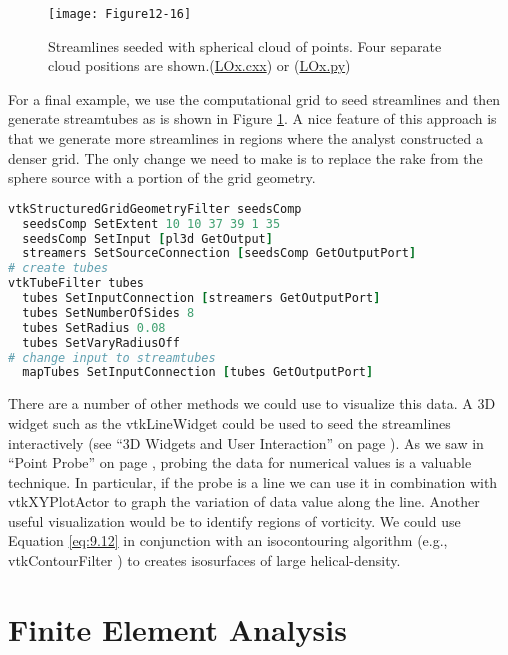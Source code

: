 \begin{figure}[!htb]
	\centering
	\texttt{[image: Figure12-16]}
	\caption{Streamlines seeded with spherical cloud of points. Four separate cloud positions are shown.(\href{https://lorensen.github.io/VTKExamples/site/Cxx/VisualizationAlgorithms/LOx/}{LOx.cxx}) or (\href{https://lorensen.github.io/VTKExamples/site/Python/VisualizationAlgorithms/LOx/}{LOx.py})}
	\label{fig:Figure12-16}
\end{figure}

For a final example, we use the computational grid to seed streamlines and then generate streamtubes as is shown in Figure \ref{fig:Figure12-16}. A nice feature of this approach is that we generate more streamlines in regions where the analyst constructed a denser grid. The only change
we need to make is to replace the rake from the sphere source with a portion of the grid geometry.

\begin{lstlisting}[language=TCL, caption={Use the computational grid to seed streamlines and then generate streamtubes.}]
vtkStructuredGridGeometryFilter seedsComp
  seedsComp SetExtent 10 10 37 39 1 35
  seedsComp SetInput [pl3d GetOutput]
  streamers SetSourceConnection [seedsComp GetOutputPort]
# create tubes
vtkTubeFilter tubes
  tubes SetInputConnection [streamers GetOutputPort]
  tubes SetNumberOfSides 8
  tubes SetRadius 0.08
  tubes SetVaryRadiusOff
# change input to streamtubes
  mapTubes SetInputConnection [tubes GetOutputPort]
\end{lstlisting}

There are a number of other methods we could use to visualize this data.
A 3D widget such as the vtkLineWidget could be used to seed the streamlines interactively (see ``3D Widgets and User Interaction'' on
page \pageref{sec:3D_widgets_user_interaction}). As we saw in ``Point Probe'' on page \pageref{subsec:examples.point_probe}, probing the data
for numerical values is a valuable technique. In particular, if the
probe is a line we can use it in combination with vtkXYPlotActor to
graph the variation of data value along the line. Another useful
visualization would be to identify regions of vorticity. We could use
Equation \ref{eq:9.12} in conjunction with an isocontouring algorithm
(e.g., vtkContourFilter ) to creates isosurfaces of large
helical-density.

\section{Finite Element Analysis}

